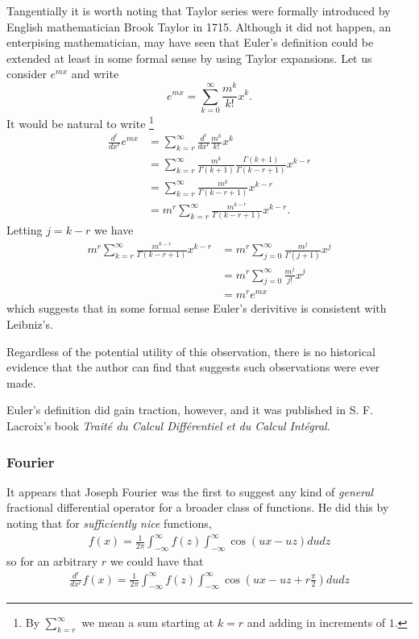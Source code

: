 \documentclass{unswmaths}
\begin{document}
Tangentially it is worth noting that Taylor series were formally introduced
by English mathematician Brook Taylor in 1715. Although it did not happen,
an enterpising mathematician, may have seen that Euler's definition could be
extended at least in some formal sense by using Taylor expansions.
Let us consider $ e^{mx} $ and write
$$
    e^{mx} = \sum_{k = 0}^\infty \frac{m^k}{k!} x^k.
$$
It would be natural to write \footnote{By $ \sum_{k = r}^\infty $ we mean a sum starting at $ k = r $ and adding in increments of $ 1 $. }
\begin{align}
    \label{eq:Euler_Leibniz_Sum}
    \frac{d^r}{dx^r} e^{mx} &= \sum_{k = r}^\infty \frac{d^r}{dx^r} \frac{m^k}{k!} x^k \\
                            &= \sum_{k = r}^\infty \frac{m^k}{\Gamma(k+1)} \frac{\Gamma(k+1)}{\Gamma(k - r + 1)} x^{k-r} \nonumber \\             
                            &= \sum_{k = r}^\infty \frac{m^k}{\Gamma(k - r + 1)}x^{k-r} \nonumber \\
                            &= m^r \sum_{k = r}^\infty \frac{m^{k-r}}{\Gamma(k - r + 1)}x^{k-r}. \nonumber
\end{align}
Letting $ j = k - r $ we have
\begin{align*}
    m^r \sum_{k = r}^\infty \frac{m^{k-r}}{\Gamma(k - r + 1)}x^{k-r}
        &= m^r \sum_{j = 0}^\infty \frac{m^{j}}{\Gamma(j + 1)}x^{j} \\
        &= m^r \sum_{j = 0}^\infty \frac{m^{j}}{j!}x^{j} \\
        &= m^r e^{mx}
\end{align*}
which suggests that in some formal sense Euler's derivitive is consistent with Leibniz's.

Regardless of the potential utility  of this observation, there is no historical evidence that the author
can find that suggests such observations were ever made.

Euler's definition did gain traction, however, and it was published in S. F. Lacroix's  book
\emph{Trait\'{e} du Calcul Diff\'{e}rentiel et du Calcul Int\'{e}gral.}
\subsubsection{Fourier}
It appears that Joseph Fourier was the first to suggest any kind of \emph{general}
fractional differential operator for a broader class of functions. He did this by noting
that for \emph{sufficiently nice} functions,
\begin{align*}
    f(x) = \frac{1}{2\pi} \int_{-\infty}^\infty f(z) \int_{-\infty}^{\infty} \cos(ux - uz)dudz
\end{align*}
so for an arbitrary $ r $ we could have that
\begin{align*}
    \frac{d^r}{dx^r}f(x) = \frac{1}{2\pi} \int_{-\infty}^\infty f(z)\int_{-\infty}^\infty \cos(ux - uz + r\frac{\pi}{2})dudz
\end{align*}
\end{document}
